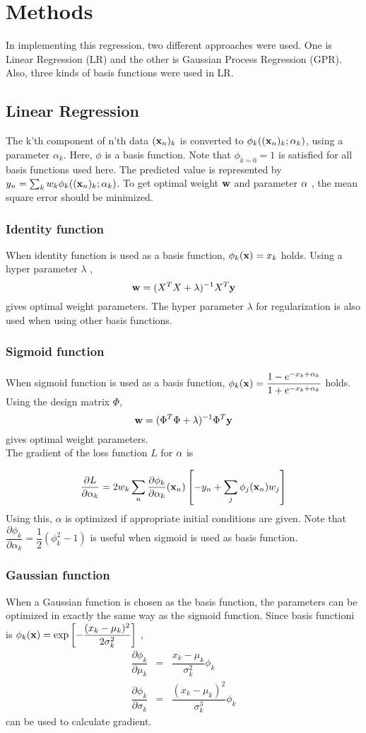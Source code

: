 \documentclass{article}
\begin{document}
\section{Methods}
In implementing this regression, two different approaches were used.
One is Linear Regression (LR) and the other is Gaussian Process Regression (GPR).
Also, three kinds of basis functions were used in LR.
\subsection{Linear Regression}
The k'th component of n'th data $({\bf x}_n)_k$ is converted to $\phi_k(({\bf x}_n)_k ;\alpha_k)$, using a parameter $\alpha_k$.
Here, $\phi$ is a basis function.
Note that $\phi_{k=0} = 1$ is satisfied for all basis functions used here.
The predicted value is represented by $y_n = \sum_k w_k \phi_k ( ({\bf x}_n )_k ; \alpha_k)$.
To get optimal weight $ {\bf w} $ and parameter $ {\bf \alpha} $ , the mean square error should be minimized.

\subsubsection{Identity function}
When identity function is used as a basis function, $ \phi_k ({\bf x}) = x_k $ holds.
Using a hyper parameter $\lambda$ ,
\[
{\bf w} = (X^T X+\lambda)^{-1} X^T {\bf y}
\]
gives optimal weight parameters.
The hyper parameter $ \lambda $ for regularization is also used when using other basis functions.
\subsubsection{Sigmoid function}
When sigmoid function is used as a basis function, $\phi_k ({\bf x}) = \dfrac{1-e^{-x_k+\alpha_k}}{1+e^{-x_k+\alpha_k}}$ holds.
Using the design matrix $\Phi$,
\[
{\bf w} = (\Phi^T \Phi+\lambda)^{-1} \Phi^T {\bf y}
\]
gives optimal weight parameters.\\
The gradient of the loss function $L$ for ${\bf \alpha}$ is

\[
\dfrac{\partial L}{\partial \alpha_k} = 2 w_k \sum_n \dfrac{\partial \phi_k}{\partial \alpha_k} ({\bf x}_n) \left[ -y_n+\sum_j \phi_j ({\bf x}_n) w_j \right]
\]
Using this, $\alpha$ is optimized if appropriate initial conditions are given.
Note that $\dfrac{\partial \phi_k}{\partial \alpha_k} = \dfrac{1}{2}(\phi_k^2-1)$ is useful when sigmoid is used as basis function.

\subsubsection{Gaussian function}
When a Gaussian function is chosen as the basis function, the parameters can be optimized in exactly the same way as the sigmoid function.
Since basis functioni is $\phi_k ({\bf x}) = \exp \left[ -\dfrac{(x_k-\mu_k)^2}{2 \sigma_k^2} \right]$ ,
\begin{eqnarray*}
\dfrac{\partial \phi_k}{\partial \mu_k} &=& \dfrac{x_k-\mu_k}{\sigma_k^2} \phi_k \\
\dfrac{\partial \phi_k}{\partial \sigma_k} &=& \dfrac{(x_k-\mu_k)^2}{\sigma_k^3} \phi_k
\end{eqnarray*}
can be used to calculate gradient.
\end{document}
